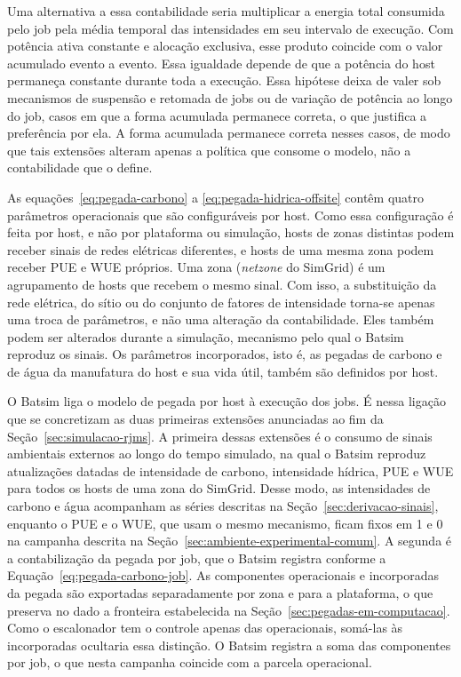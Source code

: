 Uma alternativa a essa contabilidade seria multiplicar a energia total
consumida pelo job pela média temporal das intensidades em seu intervalo de execução. Com potência ativa constante
e alocação exclusiva, esse produto coincide com o valor acumulado evento a evento. Essa igualdade depende de que 
a potência do host permaneça constante durante toda a execução. Essa hipótese deixa de valer
sob mecanismos de suspensão e retomada de jobs ou de variação de potência ao longo do job, casos em 
que a forma acumulada permanece correta, o que justifica a preferência por ela.
A forma acumulada permanece correta nesses casos, de modo que tais extensões alteram apenas
a política que consome o modelo, não a contabilidade que o define. 

As equações~\ref{eq:pegada-carbono} a \ref{eq:pegada-hidrica-offsite} contêm quatro parâmetros operacionais 
que são configuráveis por host. Como essa configuração é feita por host, e não
por plataforma ou simulação, hosts de zonas distintas podem receber sinais de redes
elétricas diferentes, e hosts de uma mesma zona podem receber PUE e WUE próprios. Uma zona 
(\textit{netzone} do SimGrid) é um agrupamento de hosts que recebem o mesmo sinal. Com isso,
a substituição da rede elétrica, do sítio ou do conjunto de fatores de intensidade torna-se apenas uma
troca de parâmetros, e não uma alteração da contabilidade. Eles também podem ser alterados
durante a simulação, mecanismo pelo qual o Batsim reproduz os sinais. Os parâmetros incorporados, isto é, 
as pegadas de carbono e de água da manufatura do host e sua vida útil, também são definidos
por host.

O Batsim liga o modelo de pegada por host à execução dos jobs. É nessa ligação que se concretizam as duas 
primeiras extensões anunciadas ao fim da Seção~\ref{sec:simulacao-rjms}. A primeira dessas extensões
é o consumo de sinais ambientais externos ao longo do tempo simulado, 
na qual o Batsim reproduz atualizações datadas de intensidade de carbono, intensidade hídrica,
PUE e WUE para todos os hosts de uma zona do SimGrid. Desse modo, as intensidades de carbono e água acompanham 
as séries descritas na Seção~\ref{sec:derivacao-sinais}, enquanto o PUE e o WUE, que usam o mesmo 
mecanismo, ficam fixos em 1 e 0 na campanha descrita na Seção~\ref{sec:ambiente-experimental-comum}.
A segunda é a contabilização da pegada por job, que o Batsim registra conforme a Equação~\ref{eq:pegada-carbono-job}. 
As componentes operacionais e incorporadas da pegada são
exportadas separadamente por zona e para a plataforma, o que preserva no dado a fronteira estabelecida
na Seção~\ref{sec:pegadas-em-computacao}. Como o escalonador tem o controle
apenas das operacionais, somá-las às incorporadas ocultaria essa distinção. O Batsim registra a soma das componentes
por job, o que nesta campanha coincide com a parcela operacional.

